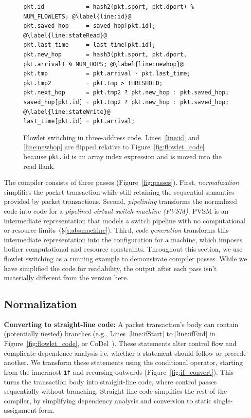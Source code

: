 \begin{figure}[!t]
\begin{minipage}{\textwidth}
\begin{lstlisting}[style=customc]
pkt.id            = hash2(pkt.sport, pkt.dport) % NUM_FLOWLETS; @\label{line:id}@
pkt.saved_hop     = saved_hop[pkt.id]; @\label{line:stateRead}@
pkt.last_time     = last_time[pkt.id];
pkt.new_hop       = hash3(pkt.sport, pkt.dport, pkt.arrival) % NUM_HOPS; @\label{line:newhop}@
pkt.tmp           = pkt.arrival - pkt.last_time;
pkt.tmp2          = pkt.tmp > THRESHOLD;
pkt.next_hop      = pkt.tmp2 ? pkt.new_hop : pkt.saved_hop;
saved_hop[pkt.id] = pkt.tmp2 ? pkt.new_hop : pkt.saved_hop; @\label{line:stateWrite}@
last_time[pkt.id] = pkt.arrival;
\end{lstlisting}
\caption[title2]{Flowlet switching in three-address
code. Lines~\ref{line:id} and \ref{line:newhop} are flipped relative
to Figure~\ref{fig:flowlet_code} because {\tt pkt.id} is an array index expression and is
moved into the read flank.}
\label{fig:three_address}
\end{minipage}
\vspace{-0.5cm}
\end{figure}

The \pktlanguage compiler consists of three passes (Figure~\ref{fig:passes}).
First, \textit{normalization} simplifies the packet transaction while still
retaining the sequential semantics provided by packet transactions. Second,
\textit{pipelining} transforms the normalized code into code for a
\textit{pipelined virtual switch machine (PVSM)}. PVSM is an intermediate
representation that models a switch pipeline with no computational or resource
limits~(\S\ref{s:absmachine}). Third, \textit{code generation} transforms this
intermediate representation into the configuration for a \absmachine machine,
which imposes bother computational and resource constraints. Throughout this
section, we use flowlet switching as a running example to demonstrate compiler
passes.  While we have simplified the code for readability, the output after
each pass isn't materially different from the version here.

\subsection{Normalization}
\label{ss:normalization}

\textbf{Converting to straight-line code: }A packet transaction's body can
contain (potentially nested) branches (e.g., Lines~\ref{line:ifStart} to
\ref{line:ifEnd} in Figure~\ref{fig:flowlet_code}, or CoDel~\cite{codel_code}).
These statements alter control flow and complicate dependence analysis i.e.
whether a statement should follow or precede another.  We transform these
statements using the conditional operator, starting from the innermost
\texttt{if} and recursing outwards (Figure~\ref{fig:if_convert}).  This turns
the transaction body into straight-line code, where control passes sequentially
without branching. Straight-line code simplifies the rest of the compiler, by
simplifying dependency analysis and conversion to static single-assignment
form.

